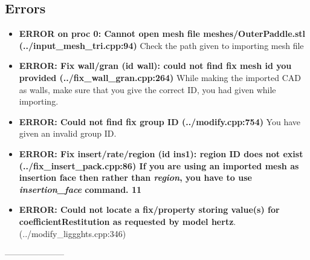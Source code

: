 \documentclass{tufte-book} %
\begin{document}
\subsection{Errors}
\begin{itemize}
\item \textbf{ERROR on proc 0: Cannot open mesh file meshes/OuterPaddle.stl (../input\_mesh\_tri.cpp:94)} Check the path given to importing mesh file
\item\textbf{ERROR: Fix wall/gran (id wall): could not find fix mesh id you provided (../fix\_wall\_gran.cpp:264)} While making the imported CAD as walls, make sure that you give the correct ID, you had given while importing.
\item \textbf{ERROR: Could not find fix group ID (../modify.cpp:754)} You have given an invalid group ID.
\item \textbf{ERROR: Fix insert/rate/region (id ins1): region ID does not exist (../fix\_insert\_pack.cpp:86) If you are using an imported mesh as insertion face then rather than \textit{region}, you have to use \textit{insertion\_face} command.
11
}
  \item \textbf{ERROR: Could not locate a fix/property storing value(s) for coefficientRestitution as requested by model hertz}. (../modify\_liggghts.cpp:346)
  
\end{itemize}
 ---------------------



\printindex %
\end{document}
